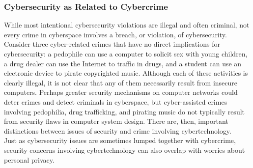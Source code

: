 \documentclass[12pt]{article}
\theoremstyle{definition}
\begin{document}
\subsubsection{Cybersecurity as Related to Cybercrime}
While most
intentional cybersecurity violations are illegal and often criminal, not every crime in
cyberspace involves a breach, or violation, of cybersecurity.\\
Consider three cyber-related crimes that have no direct implications for cybersecurity:
a pedophile can use a computer to solicit sex with young children, a drug dealer
can use the Internet to traffic in drugs, and a student can use an electronic device to pirate
copyrighted music. Although each of these activities is clearly illegal, it is not clear that
any of them necessarily result from insecure computers. Perhaps greater security
mechanisms on computer networks could deter crimes and detect criminals in cyberspace,
but cyber-assisted crimes involving pedophilia, drug trafficking, and pirating music
do not typically result from security flaws in computer system design. There are, then,
important distinctions between issues of security and crime involving cybertechnology.\\
Just as cybersecurity issues are sometimes lumped together with cybercrime, security
concerns involving cybertechnology can also overlap with worries about personal
privacy.
\end{document}
